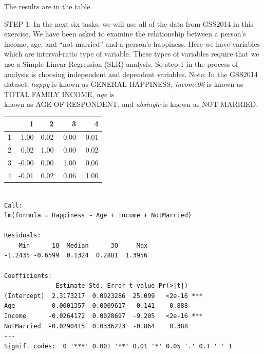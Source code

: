 \documentclass[11pt, chapterprefix=true]{scrbook}\usepackage[]{graphicx}\usepackage[]{color}
\begin{document}
\begin{exercises}
\begin{exercise}
    \end{exercise}
    \vspace{2mm}
    \begin{solution}

  The results are in the table.

    \end{solution}


  \begin{exercise} %


    STEP 1:  In the next six tasks, we will use all of the data from GSS2014 in this exercise.  We have been asked to examine the relationship between a person's income, age, and ``not married'' and a person's happiness.  Here we have variables which are  interval-ratio type of variable.  These types of variables require that we use a Simple Linear Regression (SLR) analysis.  So step 1 in the process of analysis is choosing independent and dependent variables.  Note: In the GSS2014 dataset, {\textit{happy}} is known as GENERAL HAPPINESS, {\textit{income06}} is known as TOTAL FAMILY INCOME, {\textit{age}} is \\ known as AGE OF RESPONDENT, and {\textit{absingle}} is known as NOT MARRIED.

{\small{
\begin{table}[ht]
\centering
\begin{tabular}{rrrrr}
  \hline
 & 1 & 2 & 3 & 4 \\ 
  \hline
1 & 1.00 & 0.02 & -0.00 & -0.01 \\ 
  2 & 0.02 & 1.00 & 0.00 & 0.02 \\ 
  3 & -0.00 & 0.00 & 1.00 & 0.06 \\ 
  4 & -0.01 & 0.02 & 0.06 & 1.00 \\ 
   \hline
\end{tabular}
\end{table}

}}

{\tiny{
  \begin{verbatim}

Call:
lm(formula = Happiness ~ Age + Income + NotMarried)

Residuals:
    Min      1Q  Median      3Q     Max 
-1.2435 -0.6599  0.1324  0.2881  1.3956 

Coefficients:
              Estimate Std. Error t value Pr(>|t|)    
(Intercept)  2.3173217  0.0923286  25.099   <2e-16 ***
Age          0.0001357  0.0009617   0.141    0.888    
Income      -0.0264172  0.0028697  -9.205   <2e-16 ***
NotMarried  -0.0290415  0.0336223  -0.864    0.388    
---
Signif. codes:  0 '***' 0.001 '**' 0.01 '*' 0.05 '.' 0.1 ' ' 1


\end{verbatim}}}
\end{exercise}
\end{exercises}
\end{document}
